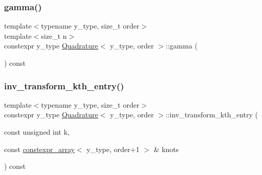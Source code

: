 \mbox{\label{class_quadrature_ad361ff7a9bfdb5721a107341abfb37d4}} 
\subsubsection{\texorpdfstring{gamma()}{gamma()}}
{\footnotesize\ttfamily template$<$typename y\+\_\+type, size\+\_\+t order$>$ \\
template$<$size\+\_\+t n$>$ \\
constexpr y\+\_\+type \hyperlink{class_quadrature}{Quadrature}$<$ y\+\_\+type, order $>$\+::gamma (\begin{DoxyParamCaption}{ }\end{DoxyParamCaption}) const\hspace{0.3cm}{\ttfamily [inline]}}

\mbox{\label{class_quadrature_a98b32f58c1a69d2430e2ed14283b07e9}} 
\subsubsection{\texorpdfstring{inv\+\_\+transform\+\_\+kth\+\_\+entry()}{inv\_transform\_kth\_entry()}}
{\footnotesize\ttfamily template$<$typename y\+\_\+type, size\+\_\+t order$>$ \\
constexpr y\+\_\+type \hyperlink{class_quadrature}{Quadrature}$<$ y\+\_\+type, order $>$\+::inv\+\_\+transform\+\_\+kth\+\_\+entry (\begin{DoxyParamCaption}\item[{const unsigned int}]{k,  }\item[{const \hyperlink{classconstexpr__array}{constexpr\+\_\+array}$<$ y\+\_\+type, order+1 $>$ \&}]{knots }\end{DoxyParamCaption}) const\hspace{0.3cm}{\ttfamily [inline]}}

\mbox{\label{class_quadrature_a14035efb920cf6ab00fae290e5bbe4bf}} 
